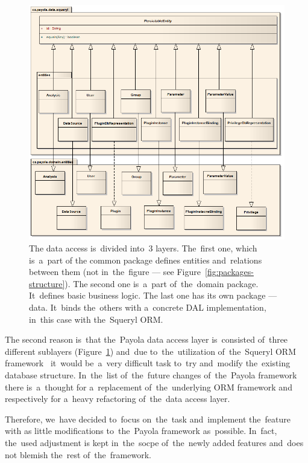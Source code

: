 \begin{figure}
	\centering
	\includegraphics[width=140mm]{img/data_entities.png}
	\caption{The data access is~divided into~3 layers. The~first one, which is~a~part of
	the common package defines entities and~relations between them (not in~the~figure ---
	see Figure~\ref{fig:packages-structure}).
	The second one is~a~part of~the~domain package. It~defines basic business logic.
	The last one has its own package --- data. It~binds the~others with a~concrete DAL
	implementation, in~this case with the~Squeryl ORM. ~\cite{payola:dg}}
	\label{fig:3-layers}
\end{figure}

The second reason is~that the~Payola data access layer is~consisted of~three different sublayers
(Figure~\ref{fig:3-layers}) and~due to~the~utilization of~the~Squeryl ORM framework~\cite{squeryl} it~would be~a~very difficult 
task to~try and~modify the~existing database structure. In~the~list of~the~future changes of~the~Payola framework there is~a~thought for a~replacement of~the~underlying ORM framework
and respectively for a~heavy refactoring of~the~data access layer.

Therefore, we~have decided to~focus on~the~task and~implement the~feature with 
as little modifications to~the~Payola framework as~possible. In~fact, the~used adjustment is
kept in~the~socpe of~the~newly added features and~does not blemish the~rest of~the~framework.

